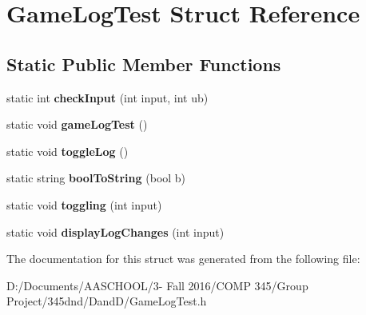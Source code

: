 \hypertarget{struct_game_log_test}{}\section{Game\+Log\+Test Struct Reference}
\label{struct_game_log_test}
\subsection*{Static Public Member Functions}
\begin{DoxyCompactItemize}
\item 
\hypertarget{struct_game_log_test_a045d291ea03bd03e1a34dfe47e4fabe9}{}\label{struct_game_log_test_a045d291ea03bd03e1a34dfe47e4fabe9} 
static int {\bfseries check\+Input} (int input, int ub)
\item 
\hypertarget{struct_game_log_test_a6c292389329b3fe7182750e76febca24}{}\label{struct_game_log_test_a6c292389329b3fe7182750e76febca24} 
static void {\bfseries game\+Log\+Test} ()
\item 
\hypertarget{struct_game_log_test_ab7a356fdcd84a51eb4be26c67c12267f}{}\label{struct_game_log_test_ab7a356fdcd84a51eb4be26c67c12267f} 
static void {\bfseries toggle\+Log} ()
\item 
\hypertarget{struct_game_log_test_a3342b38ff1ab01f3783cea40e984b0dd}{}\label{struct_game_log_test_a3342b38ff1ab01f3783cea40e984b0dd} 
static string {\bfseries bool\+To\+String} (bool b)
\item 
\hypertarget{struct_game_log_test_a62e71c95634da9ba5eee9e14fb8ef7ee}{}\label{struct_game_log_test_a62e71c95634da9ba5eee9e14fb8ef7ee} 
static void {\bfseries toggling} (int input)
\item 
\hypertarget{struct_game_log_test_a75cf89458cf14104faf5526e1fde8a3b}{}\label{struct_game_log_test_a75cf89458cf14104faf5526e1fde8a3b} 
static void {\bfseries display\+Log\+Changes} (int input)
\end{DoxyCompactItemize}


The documentation for this struct was generated from the following file\+:\begin{DoxyCompactItemize}
\item 
D\+:/\+Documents/\+A\+A\+S\+C\+H\+O\+O\+L/3-\/ Fall 2016/\+C\+O\+M\+P 345/\+Group Project/345dnd/\+Dand\+D/Game\+Log\+Test.\+h\end{DoxyCompactItemize}
